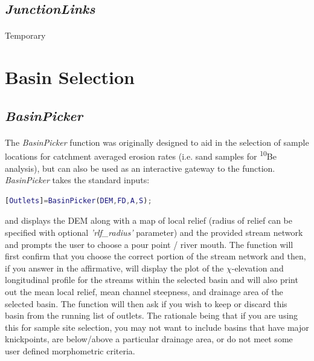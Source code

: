 \subsection{\textit{JunctionLinks}}
\paragraph{}Temporary

\section{Basin Selection}

\subsection{\textit{BasinPicker}} \label{sec:BsnPckr}
\paragraph{}The \textit{BasinPicker} function was originally designed to aid in the selection of sample locations for catchment averaged erosion rates (i.e. sand samples for  \textsuperscript{10}Be analysis), but can also be used as an interactive gateway to the  function. \textit{BasinPicker} takes the standard inputs:

\begin{lstlisting}[language=Matlab]
[Outlets]=BasinPicker(DEM,FD,A,S);
\end{lstlisting}

\noindent
 and displays the DEM along with a map of local relief (radius of relief can be specified with optional \textit{'rlf\_radius'} parameter) and the provided stream network and prompts the user to choose a pour point / river mouth. The function will first confirm that you choose the correct portion of the stream network and then, if you answer in the affirmative, will display the plot of the $\chi$-elevation and longitudinal profile for the streams within the selected basin and will also print out the mean local relief, mean channel steepness, and drainage area of the selected basin. The function will then ask if you wish to keep or discard this basin from the running list of outlets. The rationale being that if you are using this for sample site selection, you may not want to include basins that have major knickpoints, are below/above a particular drainage area, or do not meet some user defined morphometric criteria. 

